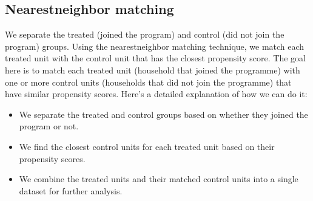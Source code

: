 \documentclass[letterpaper,10pt,english]{jupyterBook}
\begin{document}
\subsection{Nearest\sphinxhyphen{}neighbor matching}
\label{\detokenize{notebooks/propensity_scores:nearest-neighbor-matching}}
\sphinxAtStartPar
We separate the treated (joined the program) and control (did not join the program) groups. Using the nearest\sphinxhyphen{}neighbor matching technique, we match each treated unit with the control unit that has the closest propensity score. The goal here is to match each treated unit (household that joined the programme) with one or more control units (households that did not join the programme) that have similar propensity scores. Here’s a detailed explanation of how we can do it:
\begin{itemize}
\item {} 
\sphinxAtStartPar
We separate the treated and control groups based on whether they joined the program or not.

\item {} 
\sphinxAtStartPar
We find the closest control units for each treated unit based on their propensity scores.

\item {} 
\sphinxAtStartPar
We combine the treated units and their matched control units into a single dataset for further analysis.

\end{itemize}
\end{document}
